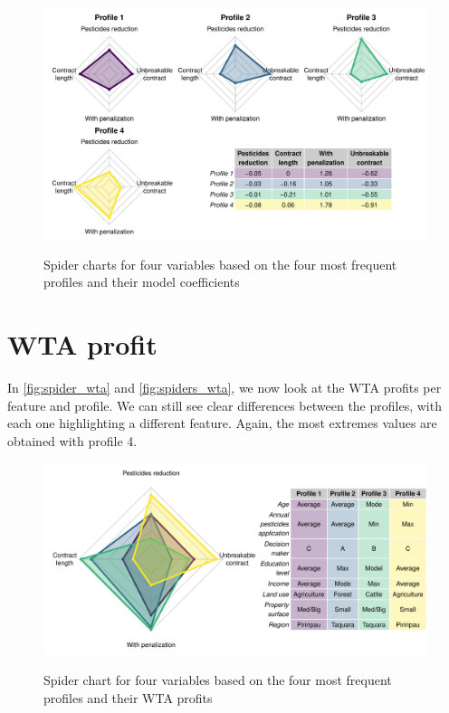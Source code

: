 \documentclass[12pt]{article}
\begin{document}
\begin{figure}[H]
 \centering
 \includegraphics[width=\textwidth]{figures/spiders.pdf}\\
 \caption{Spider charts for four variables based on the four most
          frequent profiles and their model coefficients}
 \label{fig:spiders}
\end{figure}

\section*{WTA profit}

In \autoref{fig:spider_wta} and \autoref{fig:spiders_wta}, we now look
at the WTA profits per feature and profile. We can still see clear
differences between the profiles, with each one highlighting a different
feature. Again, the most extremes values are obtained with profile 4.

\begin{figure}[H]
 \centering
 \includegraphics[width=\textwidth]{figures/spider_wta.pdf}\\
 \caption{Spider chart for four variables based on the four most
          frequent profiles and their WTA profits}
 \label{fig:spider_wta}
\end{figure}
\end{document}
